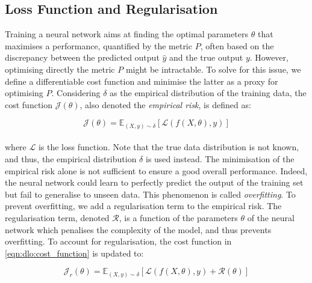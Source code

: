 
\subsection{Loss Function and Regularisation}
Training a neural network aims at finding the optimal parameters $\theta$ that
maximises a performance, quantified by the metric $P$, often based on the
discrepancy between the predicted output $\hat{y}$ and the true output $y$.
However, optimising directly the metric $P$ might be intractable. To solve for
this issue, we define a differentiable cost function and minimise the latter as
a proxy for optimising $P$. Considering $\delta$ as the empirical distribution
of the training data, the cost function $\mathcal{J}(\theta)$, also denoted the
\emph{empirical risk}, is defined as:

\begin{equation}
  \label{eqn:dlo:cost_function}
  \mathcal{J}(\theta) = \mathds{E}_{(X, y) \sim \delta} \left[ \mathcal{L}(f(X,\theta), y) \right]
\end{equation}\\

\noindent where $\mathcal{L}$ is the loss function. Note that the true data
distribution is not known, and thus, the empirical distribution $\delta$ is used
instead. The minimisation of the empirical risk alone is not sufficient to
ensure a good overall performance. Indeed, the neural network could learn to
perfectly predict the output of the training set but fail to generalise to
unseen data. This phenomenon is called \emph{overfitting}. To prevent
overfitting, we add a regularisation term to the empirical risk. The
regularisation term, denoted $\mathcal{R}$, is a function of the parameters
$\theta$ of the neural network which penalises the complexity of the model, and
thus prevents overfitting. To account for regularisation, the cost function in
\cref{eqn:dlo:cost_function} is updated to:

\begin{equation}
  \label{eqn:dlo:regularised_cost_fn}
  \mathcal{J}_r(\theta) = \mathds{E}_{(X, y) \sim \delta} \left[ \mathcal{L}(f(X,\theta), y) + \mathcal{R}(\theta) \right]
\end{equation}\\

